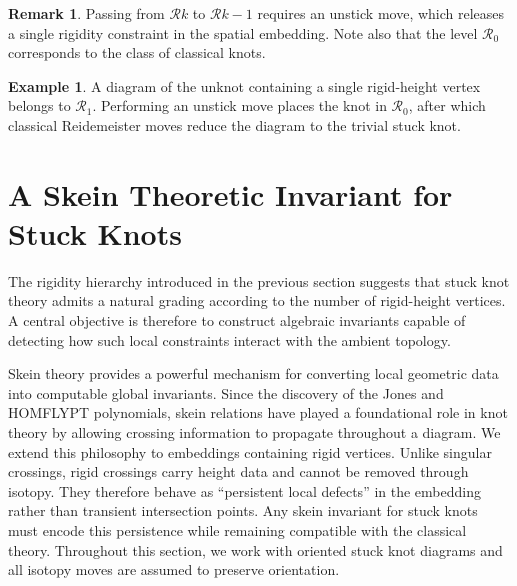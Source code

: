 \documentclass[11pt,a4paper]{article}
\theoremstyle{plain}
\theoremstyle{definition}
\newtheorem{example}[theorem]{Example}
\newtheorem{remark}[theorem]{Remark}
\begin{document}
\begin{remark}
Passing from $\mathcal{R}k$ to $\mathcal{R}{k-1}$ requires an unstick move, which releases a single rigidity constraint in the spatial embedding. Note also that the level $\mathcal{R}_0$ corresponds to the class of classical knots. 
\end{remark}

\begin{example}
A diagram of the unknot containing a single rigid-height vertex belongs to $\mathcal{R}_1$. Performing an unstick move places the knot in $\mathcal{R}_0$, after which classical Reidemeister moves reduce the diagram to the trivial stuck knot.
\end{example}









\section{A Skein Theoretic Invariant for Stuck Knots}\label{sec:HOMFLYPT}

The rigidity hierarchy introduced in the previous section suggests that stuck knot theory admits a natural grading according to the number of rigid-height vertices. A central objective is therefore to construct algebraic invariants capable of detecting how such local constraints interact with the ambient topology.

Skein theory provides a powerful mechanism for converting local geometric data into computable global invariants. Since the discovery of the Jones \cite{Jones1985} and HOMFLYPT \cite{HOMFLY} polynomials, skein relations have played a foundational role in knot theory by allowing crossing information to propagate throughout a diagram. We extend this philosophy to embeddings containing rigid vertices. Unlike singular crossings, rigid crossings carry height data and cannot be removed through isotopy. They therefore behave as ``persistent local defects'' in the embedding rather than transient intersection points. Any skein invariant for stuck knots must encode this persistence while remaining compatible with the classical theory. Throughout this section, we work with oriented stuck knot diagrams and all isotopy moves are assumed to preserve orientation.
\end{document}
